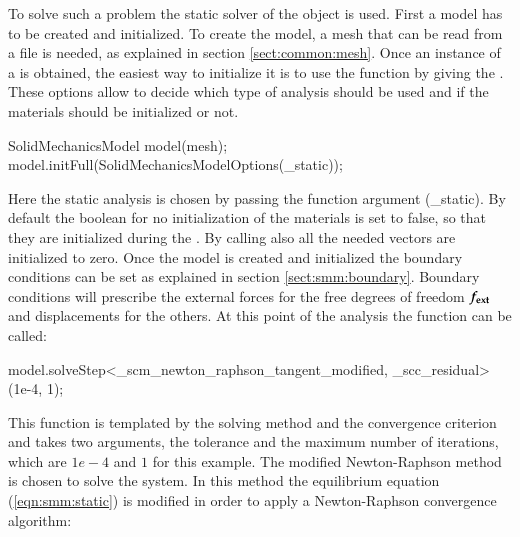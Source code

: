 To solve such a problem the static solver of the
 object is used.
First a model has to be created and initialized.  To create the model,
a mesh that can be read from a file is needed, as explained in section
\ref{sect:common:mesh}.  Once an instance of a
 is obtained, the easiest way to initialize
it is to use the 
function by giving the . These
options allow to decide which type of analysis should be used and if
the materials should be initialized or not.
\begin{cpp}
SolidMechanicsModel model(mesh);
model.initFull(SolidMechanicsModelOptions(_static));
\end{cpp}
Here the static analysis is chosen by passing the function
argument (\_static). By default the boolean for no initialization of
the materials is set to false, so that they are initialized during the
. By calling  also all the needed
vectors are initialized to zero.  Once the model is created and
initialized the boundary conditions can be set as explained in section
\ref{sect:smm:boundary}.  Boundary conditions will prescribe the
external forces for the free degrees of freedom $\boldsymbol{f_{{\mathrm{ext}}}}$
and displacements for the others.  At this point of the analysis the
function  can be
called:
\begin{cpp}
model.solveStep<_scm_newton_raphson_tangent_modified, _scc_residual>(1e-4, 1);
\end{cpp}
This function is templated by the solving method and the
convergence criterion and takes two arguments, the tolerance and the
maximum number of iterations, which are $1e-4$ and $1$ for this
example. The modified Newton-Raphson method is chosen to solve the
system. In this method the equilibrium equation (\ref{eqn:smm:static})
is modified in order to apply a Newton-Raphson convergence algorithm:

